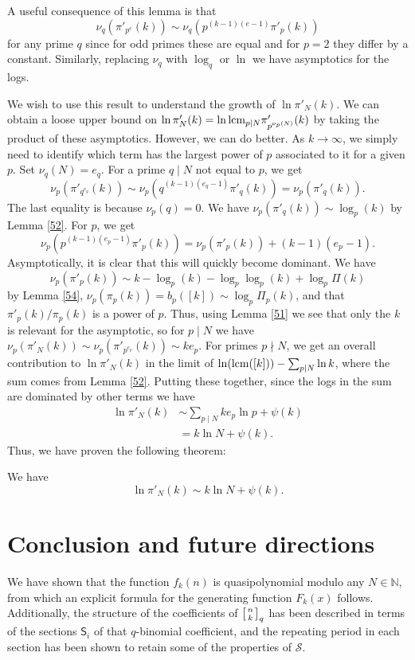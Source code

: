\documentclass[12pt]{article}
\newcommand{\bra}[1]{{\left({#1}\right)}}
\newcommand{\N}{\mathbb{N}}
\newcommand{\qbinom}[2]{\left[{#1 \atop #2}\right]_q}
\newcommand{\lcm}{\textup{lcm}}
\begin{document}
A useful consequence of this lemma is that
\[\nu_q(\pi'_{p^e}(k)) \sim \nu_q(p^{(k-1)(e-1)} \pi'_p(k))\]
for any prime $q$ since for odd primes these are equal and for $p=2$ they differ by a constant. Similarly, replacing $\nu_q$ with $\log_q$ or $\ln$ we have asymptotics for the logs.

We wish to use this result to understand the growth of $\ln \pi'_N(k)$. We can obtain a loose upper bound on $\ln \pi'_N(k) = \ln \lcm_{p\mid N}{\pi'_{p^{\nu_p(N)}}(k)}$ by taking the product of these asymptotics. However, we can do better. As $k\to \infty$, we simply need to identify which term has the largest power of $p$ associated to it for a given $p$. Set $\nu_q(N) = e_q$. For a prime $q\mid N$ not equal to $p$, we get \[\nu_p(\pi'_{q^{e_q}}(k)) \sim \nu_p\left(q^{(k-1)(e_q-1)} \pi'_q(k)\right)=\nu_p(\pi'_q(k)).\]
The last equality is because $\nu_p(q)=0$. We have $\nu_p(\pi'_q(k)) \sim \log_p(k)$ by Lemma \ref{52}. For $p$, we get
\[\nu_p\left(p^{(k-1)(e_p-1)}\pi'_p(k)\right)=\nu_p(\pi'_p(k)) + (k-1)(e_p-1).\]
Asymptotically, it is clear that this will quickly become dominant. We have
\[\nu_p \bra{\pi'_p(k)} \sim k-\log_p(k)-\log_p \log_p(k) + \log_p \Pi(k)\]
by Lemma \ref{54}, $\nu_p(\pi_p(k))=b_p([k])\sim \log_p \Pi_p(k)$, and that $\pi'_p(k)/\pi_p(k)$ is a power of $p$. Thus, using Lemma \ref{51} we see that only the $k$ is relevant for the asymptotic, so for $p\mid N$ we have $\nu_p(\pi'_N(k)) \sim \nu_p(\pi'_{p^{e_p}}(k)) \sim ke_p$. For primes $p\nmid N$, we get an overall contribution to $\ln \pi'_N(k)$ in the limit of $\ln(\lcm([k]))-\sum_{p \mid N}\ln k$, where the sum comes from Lemma \ref{52}. Putting these together, since the logs in the sum are dominated by other terms we have
\begin{align*}\ln \pi'_N(k) &\sim \sum_{p\mid N}{k e_p \ln p} + \psi(k) \\
&= k\ln N + \psi(k).
\end{align*}
Thus, we have proven the following theorem:

\begin{theorem}
We have
\[\ln \pi'_N(k) \sim k\ln N + \psi(k).\]
\end{theorem}


\section{Conclusion and future directions}

We have shown that the function $f_{k}(n)$ is quasipolynomial modulo any $N \in \N$, from which an explicit formula for the generating function $F_{k}(x)$ follows. Additionally, the structure of the coefficients of $\qbinom{n}{k}$ has been described in terms of the sections $\mathsf{S}_i$ of that $q$-binomial coefficient, and the repeating period in each section has been shown to retain some of the properties of $\mathcal{S}$. 
\end{document}
